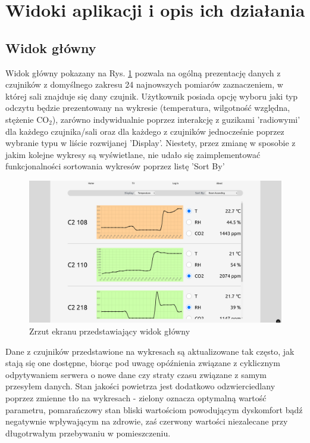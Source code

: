 \section{Widoki aplikacji i opis ich działania}

\subsection{Widok główny}
Widok główny pokazany na Rys. \ref{main-view} pozwala na ogólną prezentację danych z czujników z domyślnego zakresu 24 najnowszych pomiarów zaznaczeniem, w której sali znajduje się dany czujnik. 
Użytkownik posiada opcję wyboru jaki typ odczytu będzie prezentowany na wykresie (temperatura, wilgotność względna, stężenie CO$_2$), zarówno indywidualnie 
poprzez interakcję z guzikami 'radiowymi' dla każdego czujnika/sali oraz dla każdego z czujników jednocześnie poprzez wybranie typu
w liście rozwijanej 'Display'. Niestety, przez zmianę w sposobie z jakim kolejne wykresy są wyświetlane, nie udało
się zaimplementować funkcjonalności sortowania wykresów poprzez listę 'Sort By' 

\begin{figure}[H]
    \includegraphics[width=\textwidth]{zdj/app/main.png}
    \caption{Zrzut ekranu przedstawiający widok główny}
    \label{main-view}
\end{figure}

Dane z czujników przedstawione na wykresach są aktualizowane tak często, jak stają się one dostępne, biorąc pod uwagę opóźnienia związane
z cyklicznym odpytywaniem serwera o nowe dane czy straty czasu związane z samym przesyłem danych. Stan jakości powietrza jest dodatkowo
odzwierciedlany poprzez zmienne tło na wykresach - zielony oznacza optymalną wartość parametru, pomarańczowy stan bliski wartościom powodującym
dyskomfort bądź negatywnie wpływającym na zdrowie, zaś czerwony wartości niezalecane przy długotrwałym przebywaniu w pomieszczeniu.

